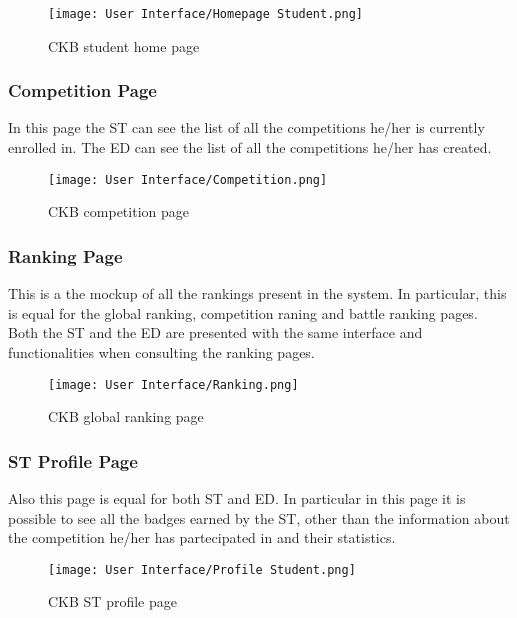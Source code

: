 \begin{figure}[H]
  \centering
  \texttt{[image: User Interface/Homepage Student.png]}
  \caption{CKB student home page}
  \label{fig:homepage}
\end{figure}

\newpage

\subsubsection*{Competition Page}
\label{ss:competition_page}%
In this page the ST can see the list of all the competitions he/her is currently enrolled in. The ED can see the list of all the competitions he/her has created.

\begin{figure}[H]
  \centering
  \texttt{[image: User Interface/Competition.png]}
  \caption{CKB competition page}
  \label{fig:competition}
\end{figure}

\newpage

\subsubsection*{Ranking Page}
\label{ss:ranking_page}%
This is a the mockup of all the rankings present in the system. In particular, this is equal for the global ranking, competition raning and battle ranking pages. Both the ST and the ED are presented with the same interface and functionalities when consulting the ranking pages.

\begin{figure}[H]
  \centering
  \texttt{[image: User Interface/Ranking.png]}
  \caption{CKB global ranking page}
  \label{fig:ranking}
\end{figure}

\newpage

\subsubsection*{ST Profile Page}
\label{ss:ST_profile_page}%
Also this page is equal for both ST and ED. In particular in this page it is possible to see all the badges earned by the ST, other than the information about the competition he/her has partecipated in and their statistics.

\begin{figure}[H]
  \centering
  \texttt{[image: User Interface/Profile Student.png]}
  \caption{CKB ST profile page}
  \label{fig:ST_profile}
\end{figure}

